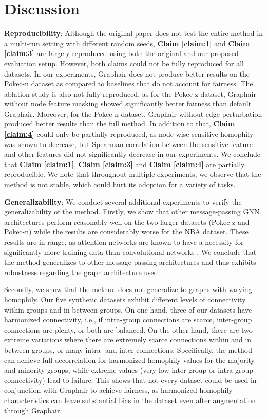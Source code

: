 \section{Discussion}\label{section:discussion}

\textbf{Reproducibility}: Although the original paper does not test the entire method in a multi-run setting with different random seeds, \textbf{Claim \ref{claim:1}} and \textbf{Claim \ref{claim:3}} are largely reproduced using both the original and our proposed evaluation setup.
However, both claims could not be fully reproduced for all datasets. In our experiments, Graphair does not produce better results on the Pokec-n dataset as compared to baselines that do not account for fairness.
The ablation study is also not fully reproduced, as for the Pokec-z dataset, Graphair without node feature masking showed significantly better fairness than default Graphair. Moreover, for the Pokec-n dataset, Graphair without edge perturbation produced better results than the full method. 
In addition to that, \textbf{Claim \ref{claim:4}} could only be partially reproduced, as node-wise sensitive homophily was shown to decrease, but Spearman correlation between the sensitive feature and other features did not significantly decrease in our experiments. 
We conclude that \textbf{Claim \ref{claim:1}}, \textbf{Claim \ref{claim:3}} and \textbf{Claim \ref{claim:4}} are partially reproducible. 
We note that throughout multiple experiments, we observe that the method is not stable, which could hurt its adoption for a variety of tasks.

\textbf{Generalizability}: We conduct several additional experiments to verify the generalizability of the method. 
Firstly, we show that other message-passing GNN architectures perform reasonably well on the two larger datasets (Pokec-z and Pokec-n) while the results are considerably worse for the NBA dataset. 
These results are in range, as attention networks are known to have a necessity for significantly more training data than convolutional networks \citep{dosovitskiy2020image}.
We conclude that the method generalizes to other message-passing architectures and thus exhibits robustness regarding the graph architecture used.

Secondly, we show that the method does not generalize to graphs with varying homophily. Our five synthetic datasets exhibit different levels of connectivity within groups and in between groups. On one hand, three of our datasets have harmonized connectivity, i.e., if intra-group connections are scarce, inter-group connections are plenty, or both are balanced. On the other hand, there are two extreme variations where there are extremely scarce connections within and in between groups, or many intra- and inter-connections.
Specifically, the method can achieve full decorrelation for harmonized homophily values for the majority and minority groups, while extreme values (very low inter-group or intra-group connectivity) lead to failure. This shows that not every dataset could be used in conjunction with Graphair to achieve fairness, as harmonized homophily characteristics can leave substantial bias in the dataset even after augmentation through Graphair.

